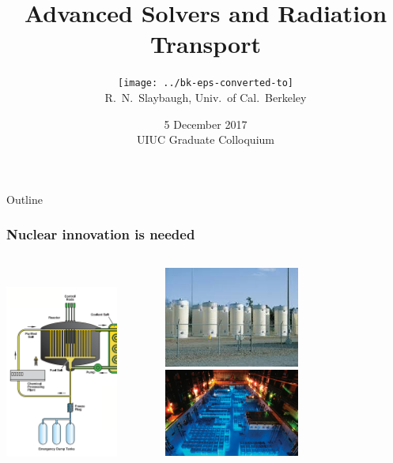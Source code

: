 \documentclass[xcolor=x11names,compress,handout]{beamer}
\title{Advanced Solvers and Radiation Transport}
\author{\texttt{[image: ../bk-eps-converted-to]}\\R.\ N.\ Slaybaugh, Univ.\ of Cal.\ Berkeley
}
\date{5 December 2017 \\ UIUC Graduate Colloquium}
\renewcommand{\(}{\begin{columns}}
\renewcommand{\)}{\end{columns}}
\newcommand{\<}[1]{\begin{column}{#1}}
\renewcommand{\>}{\end{column}}
\begin{document}
\begin{frame}
\titlepage
\end{frame}

\begin{frame}[fragile]{Outline}
  \frametitle{Nuclear innovation is needed}

\begin{columns}
  \begin{column}{0.5\textwidth}
  		\includegraphics[height=2.75in,clip]{../figs/msr-core-diagram}
  \end{column}
  \begin{column}{0.5\textwidth}
        \renewcommand*{\thesubfigure}{}
      \begin{figure}[htp]
        \centering
        \includegraphics[width=1.75in]{../figs/isfsi}

        \includegraphics[width=1.75in]{../figs/spent-fuel-pool}
      \end{figure}    
  \end{column}
\end{columns}

\end{frame}
\end{document}
